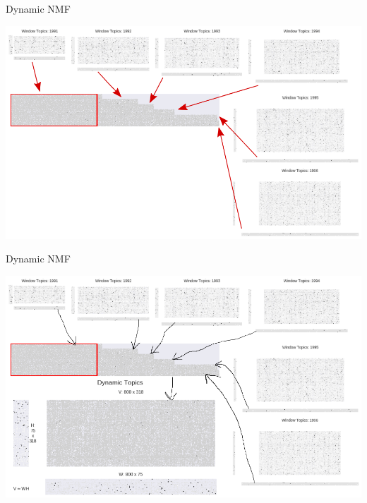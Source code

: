 \documentclass[9pt]{beamer}
\begin{document}
\begin{frame}[t]{Dynamic NMF}

\includegraphics[width=\linewidth]{../plots/sustainability/conceptual_annotated_1}

\end{frame}

\begin{frame}[t]{Dynamic NMF}

\includegraphics[width=\linewidth]{../plots/sustainability/conceptual_annotated_2}

\end{frame}
\end{document}
